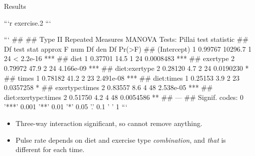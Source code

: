 \documentclass[ignorenonframetext,]{beamer}
\begin{document}
\begin{frame}{Results}
\protect\hypertarget{results-1}{}

\begin{scriptsize}

```r
exercise.2
```

```
## 
## Type II Repeated Measures MANOVA Tests: Pillai test statistic
##                     Df test stat approx F num Df den Df    Pr(>F)    
## (Intercept)          1   0.99767  10296.7      1     24 < 2.2e-16 ***
## diet                 1   0.37701     14.5      1     24 0.0008483 ***
## exertype             2   0.79972     47.9      2     24 4.166e-09 ***
## diet:exertype        2   0.28120      4.7      2     24 0.0190230 *  
## times                1   0.78182     41.2      2     23 2.491e-08 ***
## diet:times           1   0.25153      3.9      2     23 0.0357258 *  
## exertype:times       2   0.83557      8.6      4     48 2.538e-05 ***
## diet:exertype:times  2   0.51750      4.2      4     48 0.0054586 ** 
## ---
## Signif. codes:  0 '***' 0.001 '**' 0.01 '*' 0.05 '.' 0.1 ' ' 1
```

       
\end{scriptsize}

\begin{itemize}
\item
  Three-way interaction significant, so cannot remove anything.
\item
  Pulse rate depends on diet and exercise type \emph{combination}, and
  \emph{that} is different for each time.
\end{itemize}

\end{frame}
\end{document}
